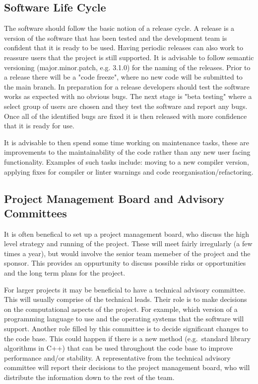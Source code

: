 \documentclass[jnr]{iosart2x}
\begin{document}
\subsection{Software Life Cycle}\label{lc}
The software should follow the basic notion of a release cycle.
A release is a version of the software that has been tested and the development team is confident that it is ready to be used.
Having periodic releases can also work to reassure users that the project is still supported.
It is advisable to follow semantic versioning \cite{Semantic_Versioning} (major.minor.patch, e.g. 3.1.0) for the naming of the releases.
Prior to a release there will be a "code freeze", where no new code will be submitted to the main branch.
In preparation for a release developers should test the software works as expected with no obvious bugs.
The next stage is "beta testing" where a select group of users are chosen and they test the software and report any bugs.
Once all of the identified bugs are fixed it is then released with more confidence that it is ready for use.

It is advisable to then spend some time working on maintenance tasks, these are improvements to the maintainability of the code rather than any new user facing functionality.
Examples of such tasks include: moving to a new compiler version, applying fixes for compiler or linter warnings and code reorganisation/refactoring.

\subsection{Project Management Board and Advisory Committees}\label{PM big}

It is often benefical to set up a project management board, who discuss the high level strategy and running of the project.
These will meet fairly irregularly (a few times a year), but would involve the senior team memeber of the project and the sponsor.
This provides an oppurtunity to discuss possible risks or opportunities and the long term plans for the project.

For larger projects it may be beneficial to have a technical advisory committee.
This will usually comprise of the technical leads.
Their role is to make decisions on the computational aspects of the project.
For example, which version of a programming language to use and the operating systems that the software will support.
Another role filled by this committee is to decide significant changes to the code base.
This could happen if there is a new method (e.g.\ standard library algorithms in C++) that can be used throughout the code base to improve performance and/or stability.
A representative from the technical advisory committee will report their decisions to the project management board, who will distribute the information down to the rest of the team.
\end{document}
